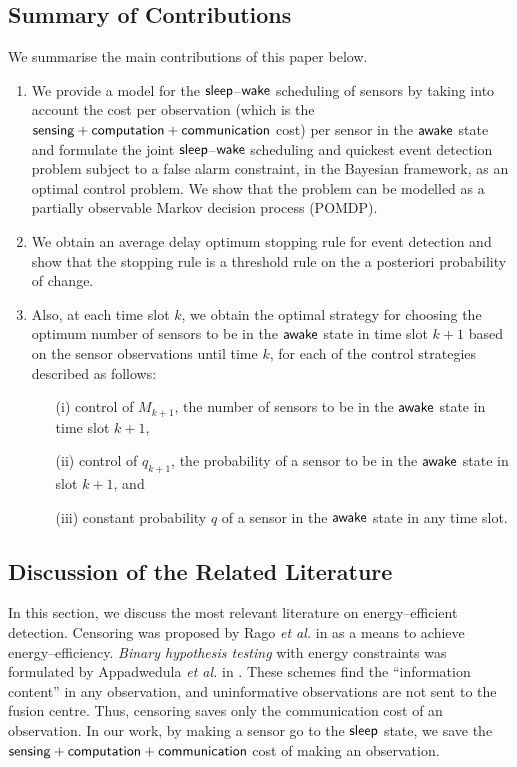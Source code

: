 \documentclass[journal]{IEEEtran}
\newcommand{\sleep}{{${\sf sleep }$}}
\newcommand{\wake}{{${\sf awake }$}}
\begin{document}
\subsection{Summary of Contributions}
\label{subsec:summary_of_contributions}
We summarise the main contributions of this paper below.
\begin{enumerate}
\item We provide a model for the \sleep--${\sf wake}$ scheduling of 
      sensors by taking into account the cost per observation (which is
	  the ${\sf sensing+computation+communication}$ cost) per sensor in
	  the {\wake} state and formulate the joint \sleep--${\sf wake}$
	  scheduling and quickest event detection problem subject to a false
	  alarm constraint, in the Bayesian framework, as an optimal control
	  problem. We show that the problem can be modelled as a partially 
	  observable Markov decision process (POMDP).

\item We obtain an average delay optimum stopping rule for event 
      detection and show that the stopping rule is a threshold rule on
	  the a posteriori probability of change. 

\item Also, at each time slot $k$, we obtain the optimal strategy for 
      choosing the optimum number of sensors to be in the {\wake} state in 
	  time slot $k+1$ based on the sensor observations until time $k$,
	  for each of the control strategies described as follows: 
      \begin{enumerate}
      \item[(i)]   control of $M_{k+1}$, the number of sensors to be in 
	               the {\wake} state in time slot $k+1$, 
      \item[(ii)]  control of $q_{k+1}$, the probability of a sensor to 
	               be in the {\wake} state in slot $k+1$, and
      \item[(iii)] constant probability $q$ of a sensor in the {\wake}
	               state in any time slot.
      \end{enumerate}
\end{enumerate}


\subsection{Discussion of the Related Literature}
\label{subsec:discussion_of_the_related_literature}
In this section, we discuss the most relevant literature on
energy--efficient detection. Censoring was proposed by Rago {\em et al.}
in \cite{rago-etal96censoring} as a means to achieve energy--efficiency.
{\em Binary hypothesis testing} with energy constraints was formulated
by Appadwedula {\em et al.} in
\cite{stat-sig-proc.appadwedula-etal05energy-efficient-detection}. These
schemes find the ``information content'' in any observation, and
uninformative observations are not sent to the fusion centre. Thus,
censoring saves only the communication cost of an observation. In our
work, by making a sensor go to the {\sleep} state, we save the ${\sf
sensing+computation+communication}$ cost of making an observation. 
\end{document}
